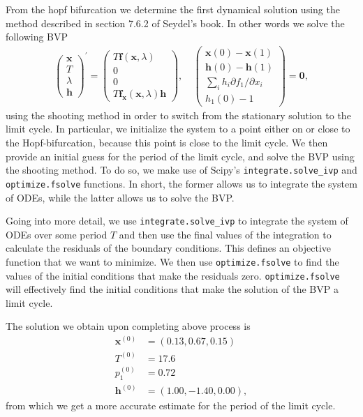 From the hopf bifurcation we determine the first dynamical solution using the method described in 
section 7.6.2 of Seydel's book. In other words we solve the following BVP 
\begin{align*}
    \left(\begin{array}{l}
        \mathbf{x} \\
        T \\
        \lambda \\
        \mathbf{h}
        \end{array}\right)^{\prime}=\left(\begin{array}{c}
        T \mathbf{f}(\mathbf{x}, \lambda) \\
        0 \\
        0 \\
        T \mathbf{f}_{\mathbf{x}}(\mathbf{x}, \lambda) \mathbf{h}
        \end{array}\right), \quad\left(\begin{array}{c}
        \mathbf{x}(0)-\mathbf{x}(1) \\
        \mathbf{h}(0)-\mathbf{h}(1) \\
        \sum_i h_i \partial f_1 / \partial x_i \\
        h_1(0)-1
        \end{array}\right)=\mathbf{0},
\end{align*}
using the shooting method in order to switch from the stationary solution to the limit cycle. In particular, we initialize the system 
to a point either on or close to the Hopf-bifurcation, because this point is close to the limit cycle. We then provide an initial guess for the 
period of the limit cycle, and solve the BVP using the shooting method. To do so, we make use of Scipy's \lstinline|integrate.solve_ivp| and \lstinline|optimize.fsolve| functions.
In short, the former allows us to integrate the system of ODEs, while the latter allows us to solve the BVP. 

Going into more detail, we use \lstinline|integrate.solve_ivp| to integrate the system of ODEs over some period $T$ and then use the final values of the integration to calculate the residuals of the boundary conditions.
This defines an objective function that we want to minimize. We then use \lstinline|optimize.fsolve| to find the values of the initial conditions that make the residuals zero. \lstinline|optimize.fsolve| will 
effectively find the initial conditions that make the solution of the BVP a limit cycle.

The solution we obtain upon completing above process is
\begin{align*}
    \mathbf{x}^{(0)} & = (0.13, 0.67, 0.15)\\
    T^{(0)} &= 17.6\\
    p_1^{(0)} & = 0.72 \\
    \mathbf{h}^{(0)} &= (1.00, -1.40 , 0.00),
\end{align*}
from which we get a more accurate estimate for the period of the limit cycle.

